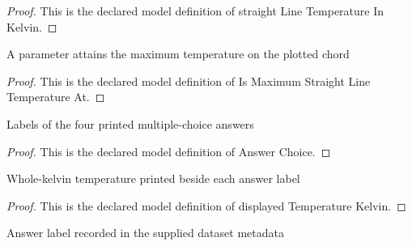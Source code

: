 \begin{proof}
  This is the declared model definition of straight Line Temperature In Kelvin.
\end{proof}
\begin{definition}
  \label{def:physics:phyx-mini-0370:phyxminiproblems-problemphyxmini0370-ismaximumstraightlinetemperatureat}
  A parameter attains the maximum temperature on the plotted chord
\end{definition}
\begin{proof}
  This is the declared model definition of Is Maximum Straight Line Temperature At.
\end{proof}
\begin{definition}
  \label{def:physics:phyx-mini-0370:phyxminiproblems-problemphyxmini0370-answerchoice}
  Labels of the four printed multiple-choice answers
\end{definition}
\begin{proof}
  This is the declared model definition of Answer Choice.
\end{proof}
\begin{definition}
  \label{def:physics:phyx-mini-0370:phyxminiproblems-problemphyxmini0370-displayedtemperaturekelvin}
  Whole-kelvin temperature printed beside each answer label
\end{definition}
\begin{proof}
  This is the declared model definition of displayed Temperature Kelvin.
\end{proof}
\begin{definition}
  \label{def:physics:phyx-mini-0370:phyxminiproblems-problemphyxmini0370-recordeddatasetanswer}
  Answer label recorded in the supplied dataset metadata
\end{definition}
